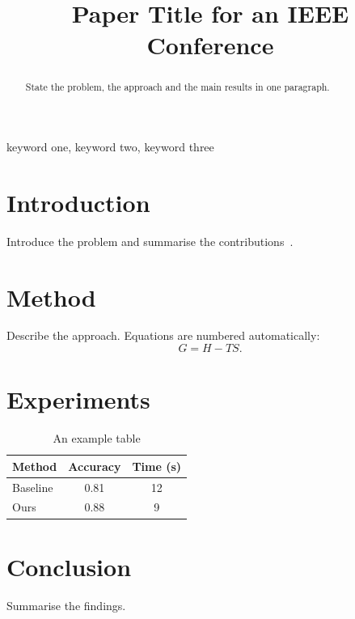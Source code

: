 \documentclass[conference]{IEEEtran}
\begin{document}
\title{Paper Title for an IEEE Conference}

\author{
  \and
}

\maketitle

\begin{abstract}
State the problem, the approach and the main results in one paragraph.
\end{abstract}

\begin{IEEEkeywords}
keyword one, keyword two, keyword three
\end{IEEEkeywords}

\section{Introduction}
Introduce the problem and summarise the contributions~\cite{knuth1984,lamport1994}.

\section{Method}
Describe the approach. Equations are numbered automatically:
\begin{equation}
  G = H - TS .
\end{equation}

\section{Experiments}
\begin{table}[htbp]
  \caption{An example table}
  \centering
  \begin{tabular}{lcc}
    \toprule
    Method & Accuracy & Time (s) \\
    \midrule
    Baseline & 0.81 & 12 \\
    Ours & 0.88 & 9 \\
    \bottomrule
  \end{tabular}
\end{table}

\section{Conclusion}
Summarise the findings.



\end{document}
